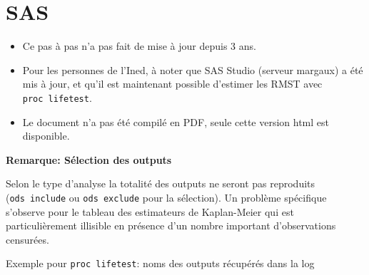 \documentclass[
  12pt,
  letterpaper,
  DIV=11,
  numbers=noendperiod,
  onepage,
  openany]{scrreprt}
\providecommand{\tightlist}{%
  \setlength{\itemsep}{0pt}\setlength{\parskip}{0pt}}\usepackage{longtable,booktabs,array}
\begin{document}
\hypertarget{sas-7}{%
\chapter{\texorpdfstring{\textbf{SAS}}{SAS}}\label{sas-7}}

\begin{tcolorbox}[enhanced jigsaw, arc=.35mm, bottomrule=.15mm, titlerule=0mm, colbacktitle=quarto-callout-note-color!10!white, left=2mm, opacitybacktitle=0.6, toprule=.15mm, title=\textcolor{quarto-callout-note-color}{\faInfo}\hspace{0.5em}{Note}, colframe=quarto-callout-note-color-frame, breakable, coltitle=black, opacityback=0, toptitle=1mm, bottomtitle=1mm, rightrule=.15mm, leftrule=.75mm, colback=white]

\begin{itemize}
\tightlist
\item
  Ce pas à pas n'a pas fait de mise à jour depuis 3 ans.
\item
  Pour les personnes de l'Ined, à noter que SAS Studio (serveur margaux)
  a été mis à jour, et qu'il est maintenant possible d'estimer les RMST
  avec \texttt{proc\ lifetest}.
\item
  Le document n'a pas été compilé en PDF, seule cette version html est
  disponible.
\end{itemize}

\end{tcolorbox}

\textbf{Remarque: Sélection des outputs}

Selon le type d'analyse la totalité des outputs ne seront pas reproduits
(\texttt{ods\ include} ou \texttt{ods\ exclude} pour la sélection). Un
problème spécifique s'observe pour le tableau des estimateurs de
Kaplan-Meier qui est particulièrement illisible en présence d'un nombre
important d'observations censurées.

Exemple pour \texttt{proc\ lifetest}: noms des outputs récupérés dans la
log
\end{document}
